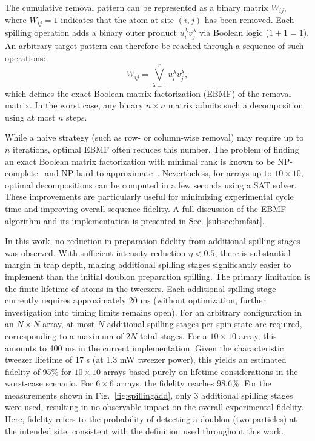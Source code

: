 The cumulative removal pattern can be represented as a binary matrix $W_{ij}$, where $W_{ij} = 1$ indicates that the atom at site $(i, j)$ has been removed. Each spilling operation adds a binary outer product $u^\lambda_i v^\lambda_j$ via Boolean logic ($1 + 1 = 1$). An arbitrary target pattern can therefore be reached through a sequence of such operations:
\begin{equation}
    \label{eq:ebmf}
    W_{ij} = \bigvee_{\lambda=1}^{r} u^\lambda_i v^\lambda_j,
\end{equation}
which defines the exact Boolean matrix factorization (EBMF) of the removal matrix. In the worst case, any binary $n \times n$ matrix admits such a decomposition using at most $n$ steps.

While a naive strategy (such as row- or column-wise removal) may require up to $n$ iterations, optimal EBMF often reduces this number. The problem of finding an exact Boolean matrix factorization with minimal rank is known to be NP-complete~\cite{orlin_contentment_1977} and NP-hard to approximate~\cite{gruber_inapproximability_2007}. Nevertheless, for arrays up to $10 \times 10$, optimal decompositions can be computed in a few seconds using a SAT solver. These improvements are particularly useful for minimizing experimental cycle time and improving overall sequence fidelity. A full discussion of the EBMF algorithm and its implementation is presented in Sec. \ref{subsec:bmfsat}.

In this work, no reduction in preparation fidelity from additional spilling stages was observed. With sufficient intensity reduction $\eta < 0.5$, there is substantial margin in trap depth, making additional spilling stages significantly easier to implement than the initial doublon preparation spilling. The primary limitation is the finite lifetime of atoms in the tweezers. Each additional spilling stage currently requires approximately 20 ms (without optimization, further investigation into timing limits remains open). For an arbitrary configuration in an $N \times N$ array, at most $N$ additional spilling stages per spin state are required, corresponding to a maximum of $2N$ total stages. For a $10 \times 10$ array, this amounts to 400 ms in the current implementation. Given the characteristic tweezer lifetime of 17 s (at 1.3 mW tweezer power), this yields an estimated fidelity of 95\% for $10 \times 10$ arrays based purely on lifetime considerations in the worst-case scenario. For $6 \times 6$ arrays, the fidelity reaches 98.6\%. For the measurements shown in Fig.~\ref{fig:spillingadd}, only 3 additional spilling stages were used, resulting in no observable impact on the overall experimental fidelity. Here, fidelity refers to the probability of detecting a doublon (two particles) at the intended site, consistent with the definition used throughout this work.

